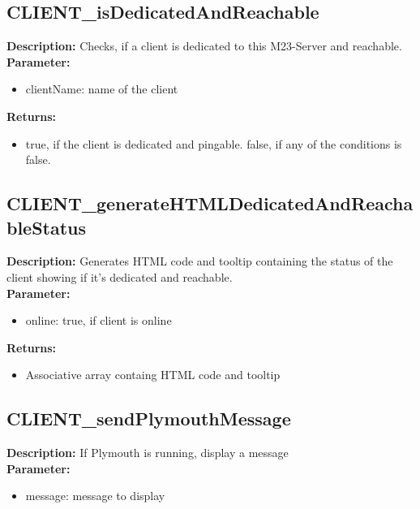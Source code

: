 \subsection{CLIENT\_isDedicatedAndReachable}
\textbf{Description:} Checks, if a client is dedicated to this M23-Server and reachable.\\
\textbf{Parameter:}
\begin{itemize}
\item clientName: name of the client
\end{itemize}
\textbf{Returns:}
\begin{itemize}
\item true, if the client is dedicated and pingable. false, if any of the conditions is false.
\end{itemize}

\subsection{CLIENT\_generateHTMLDedicatedAndReachableStatus}
\textbf{Description:} Generates HTML code and tooltip containing the status of the client showing if it's dedicated and reachable.\\
\textbf{Parameter:}
\begin{itemize}
\item online: true, if client is online
\end{itemize}
\textbf{Returns:}
\begin{itemize}
\item Associative array containg HTML code and tooltip 
\end{itemize}

\subsection{CLIENT\_sendPlymouthMessage}
\textbf{Description:} If Plymouth is running, display a message\\
\textbf{Parameter:}
\begin{itemize}
\item message: message to display
\end{itemize}

